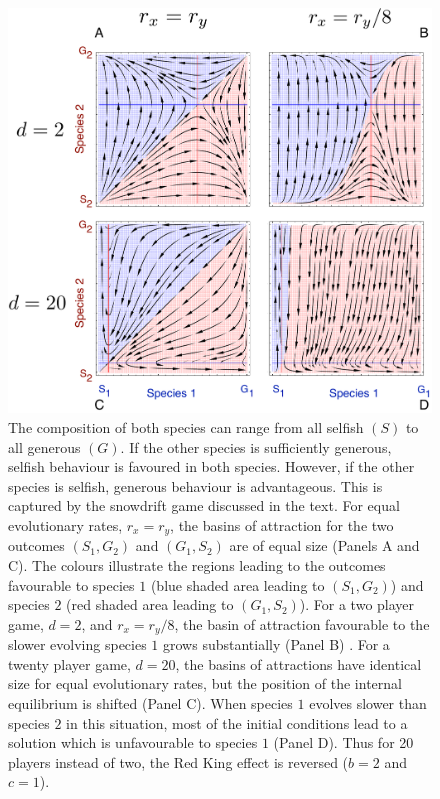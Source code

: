 \documentclass[aps,pre,amsfonts,floatfix, onecolumn,showkeys]{revtex4-1}
\begin{document}
\begin{figure}[h]
\includegraphics[width=\columnwidth]{compare.pdf}
\caption{
The composition of both species can range from all selfish $(S)$ to all generous $(G)$. 
If the other species is sufficiently generous, selfish behaviour is favoured in both species.
However, if the other species is selfish, generous behaviour is advantageous.  
This is captured by the snowdrift game discussed in the text.
For equal evolutionary rates, $r_x=r_y$, the basins of attraction for the two outcomes $(S_1, G_2)$ and $(G_1, S_2)$
are of equal size (Panels A and C).
The colours illustrate the regions leading to the outcomes favourable to species $1$ (blue shaded area leading to $(S_1, G_2)$) 
and species $2$ (red shaded area leading to $(G_1, S_2)$).
For a two player game, $d=2$, and $r_x=r_y/8$, the basin of attraction favourable to the slower evolving species $1$ grows substantially (Panel B) \cite{bergstrom:PNAS:2003}.
For a twenty player game, $d=20$, the basins of attractions have identical size for equal evolutionary rates, but the position of the internal equilibrium is shifted (Panel C).
When species $1$ evolves slower than species $2$ in this situation, most of the initial conditions lead to a solution which is unfavourable to species $1$ (Panel D).
Thus for 20 players instead of two, the Red King effect is reversed ($b=2$ and $c=1$).
\label{fig:compare}
}
\end{figure}
\end{document}
